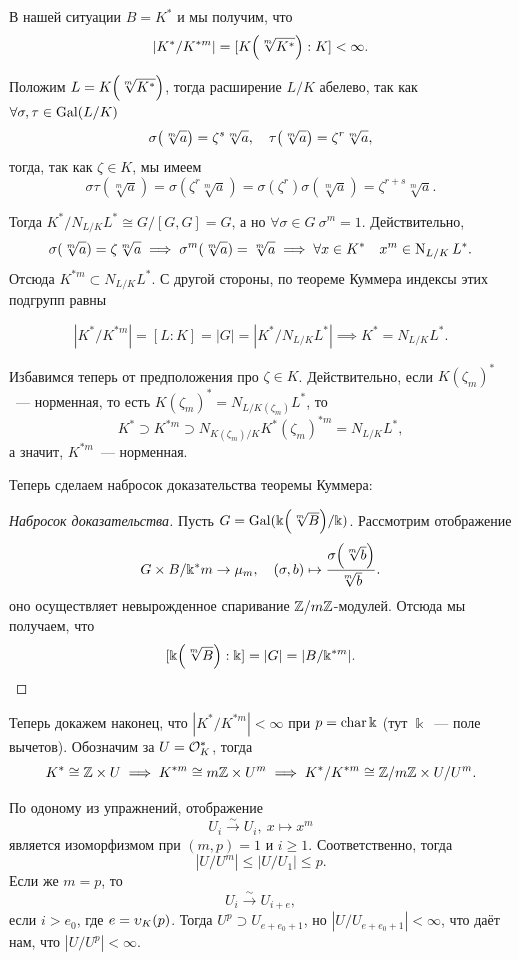 	В нашей ситуации $B = K^*$ и мы получим, что 
	\[
		|K^*/K^{* m}| = [K\lr*{\sqrt[m]{K^*}} : K] < \infty.
	\]

	Положим $L = K\lr*{\sqrt[m]{K^*}}$, тогда расширение $L/K$ абелево, так как $\forall \sigma, \tau \in \operatorname{Gal}(L/K)$
	\[
		\sigma\lr*{\sqrt[m]{a}} = \zeta^s \sqrt[m]{a}, \quad \tau\lr*{\sqrt[m]{a}} = \zeta^r \sqrt[m]{a},  
	\]
	тогда, так как $\zeta \in K$, мы имеем 
	\[
		\sigma\tau(\sqrt[m]{a}) = \sigma(\zeta^r \sqrt[m]{a}) = \sigma(\zeta^r) \sigma(\sqrt[m]{a}) = \zeta^{r + s} \sqrt[m]{a}. 
	\]

	Тогда $K^*/N_{L/K}L^* \cong G/[G, G] = G$, а но $\forall \sigma \in G \ \sigma^m = 1$. Действительно, 
	\[
		\sigma(\sqrt[m]{a}) = \zeta \sqrt[m]{a} \implies \sigma^m(\sqrt[m]{a}) = \sqrt[m]{a} \implies \forall x \in K^* \quad x^m \in \operatorname{\mathrm{N}}_{L/K}L^*.
	\]
	Отсюда $K^{*m} \subset N_{L/K}L^*$. С другой стороны, по теореме Куммера индексы этих подгрупп равны 
	
	\[
		|K^*/K^{* m}| = [L : K] = |G| = |K^*/N_{L/K}L^*| \implies K^* = N_{L/K}L^*.
	\]

	Избавимся теперь от предположения про $\zeta \in K$. Действительно, если $K(\zeta_m)^*$~--- норменная,  то есть $K(\zeta_m)^* = N_{L/K(\zeta_m)}L^*$, то 
	\[
		K^* \supset K^{* m} \supset N_{K(\zeta_m)/K}K^*(\zeta_m)^{* m} = N_{L/K}L^*,
	\]
	а значит, $K^{*m}$~--- норменная. 

	Теперь сделаем набросок доказательства теоремы Куммера: 

	\begin{proof}[Набросок доказательства]
		Пусть $G = \Gal(\Bbbk\lr*{\sqrt[m]{B}}/\Bbbk)$.  Рассмотрим отображение 
		\[
			G \times B/\Bbbk^{*}m \to \mu_m, \quad (\sigma, b) \mapsto \frac{\sigma\lr*{\sqrt[m]{b}}}{\sqrt[m]{b}}.
		\]
		оно осуществляет невырожденное спаривание $\mathbb{Z}/m\mathbb{Z}$-модулей. Отсюда мы получаем, что 
		\[
			[\Bbbk\lr*{\sqrt[m]{B}} : \Bbbk] = |G| = |B/\Bbbk^{*m}|. 
		\]
	\end{proof}


	Теперь докажем наконец, что $|K^*/K^{* m}| < \infty$ при $p = \operatorname{char}{\Bbbk}$  (тут $\Bbbk$~--- поле вычетов). Обозначим за $U = \mathcal{O}_K^*$, тогда 
	\[
		K^* \cong \mathbb{Z} \times U \implies K^{* m} \cong m\mathbb{Z} \times U^m \implies K^*/K^{* m} \cong \mathbb{Z}/m\mathbb{Z} \times U/U^m.
	\]

	По одоному из упражнений, отображение 
	\[
		U_i \xrightarrow{\sim} U_i, \ x \mapsto x^m
	\]
	является изоморфизмом при $(m, p) = 1$ и $i \ge 1$. Соответственно, тогда 
	\[
		|U/U^m| \le |U/U_1| \le p.
	\]
	Если же $m = p$, то 
	\[
		U_i \xrightarrow{\sim} U_{i + e},
	\]
	если $i > e_0$, где  $e = \upsilon_{K}(p)$. Тогда $U^p \supset U_{e + e_0 + 1}$, но $|U/U_{e + e_0 + 1}| < \infty$, что даёт нам, что $|U/U^p| < \infty$. 

